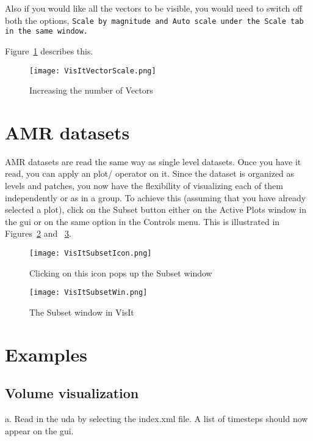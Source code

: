 Also if you would like all the vectors to be visible, you would need to switch off both the options,
\tt Scale by magnitude
\normalfont and
\tt Auto scale
\normalfont under the Scale tab in the same window.

Figure~\ref{VisItVectorScale} describes this.

\begin{figure}
  \center
  \texttt{[image: VisItVectorScale.png]}
  \caption{Increasing the number of Vectors}
  \label{VisItVectorScale}
\end{figure}

\section{AMR datasets}

AMR datasets are read the same way as single level datasets. Once you have it read, you can apply an plot/ operator on it. Since the dataset is organized as levels and patches, you now have the flexibility of visualizing each of them independently or as in a group. To achieve this (assuming that you have already selected a plot), click on the Subset button either on the Active Plots window in the gui or on the same option in the Controls menu. This is illustrated in Figures~\ref{VisItSubsetIcon} and ~\ref{VisItSubsetWin}.

\begin{figure}
  \center
  \texttt{[image: VisItSubsetIcon.png]}
  \caption{Clicking on this icon pops up the Subset window}
  \label{VisItSubsetIcon}
\end{figure}

\begin{figure}
  \center
  \texttt{[image: VisItSubsetWin.png]}
  \caption{The Subset window in VisIt}
  \label{VisItSubsetWin}
\end{figure}

\section{Examples}

\subsection{Volume visualization}

a. Read in the uda by selecting the index.xml file. A list of timesteps should now appear on the gui.

